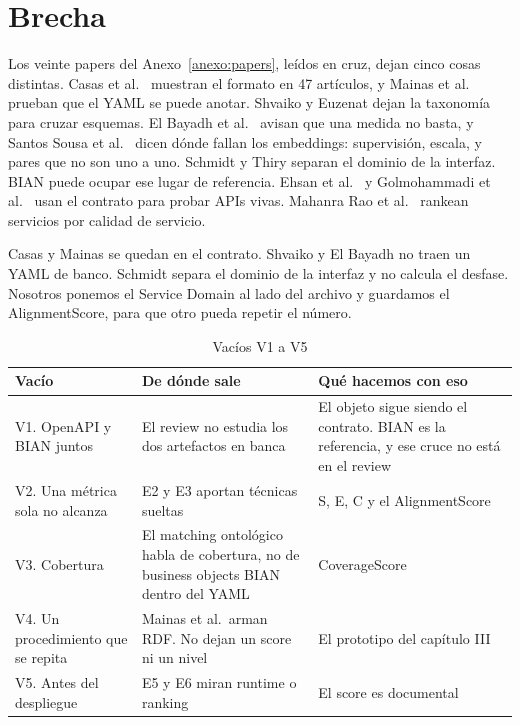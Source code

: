 \section{Brecha}

Los veinte papers del Anexo~\ref{anexo:papers}, leídos en cruz, dejan cinco cosas distintas. Casas et al.\ \cite{Casas2021} muestran el formato en 47 artículos, y Mainas et al.\ \cite{Mainas2023} prueban que el YAML se puede anotar. Shvaiko y Euzenat \cite{Shvaiko2005} dejan la taxonomía para cruzar esquemas. El Bayadh et al.\ \cite{ElBayadh2015} avisan que una medida no basta, y Santos Sousa et al.\ \cite{SantosSousa2026} dicen dónde fallan los embeddings: supervisión, escala, y pares que no son uno a uno. Schmidt y Thiry \cite{Schmidt2020} separan el dominio de la interfaz. BIAN puede ocupar ese lugar de referencia. Ehsan et al.\ \cite{Ehsan2022} y Golmohammadi et al.\ \cite{Golmohammadi2024} usan el contrato para probar APIs vivas. Mahanra Rao et al.\ \cite{MahanraRao2025} rankean servicios por calidad de servicio.

Casas y Mainas se quedan en el contrato. Shvaiko y El Bayadh no traen un YAML de banco. Schmidt separa el dominio de la interfaz y no calcula el desfase. Nosotros ponemos el Service Domain al lado del archivo y guardamos el AlignmentScore, para que otro pueda repetir el número.

\begin{table}[ht]
  \centering
  \caption{Vacíos V1 a V5}
  \label{tab:vacios}
  \footnotesize
  \begin{tabular}{@{}p{}p{}p{}@{}}
    \toprule
    Vacío & De dónde sale & Qué hacemos con eso \\
    \midrule
    V1. OpenAPI y BIAN juntos & El review no estudia los dos artefactos en banca & El objeto sigue siendo el contrato. BIAN es la referencia, y ese cruce no está en el review \\
    V2. Una métrica sola no alcanza & E2 y E3 aportan técnicas sueltas & S, E, C y el AlignmentScore \\
    V3. Cobertura & El matching ontológico habla de cobertura, no de business objects BIAN dentro del YAML & CoverageScore \\
    V4. Un procedimiento que se repita & Mainas et al.\ arman RDF. No dejan un score ni un nivel & El prototipo del capítulo III \\
    V5. Antes del despliegue & E5 y E6 miran runtime o ranking & El score es documental \\
    \bottomrule
  \end{tabular}
\end{table}

